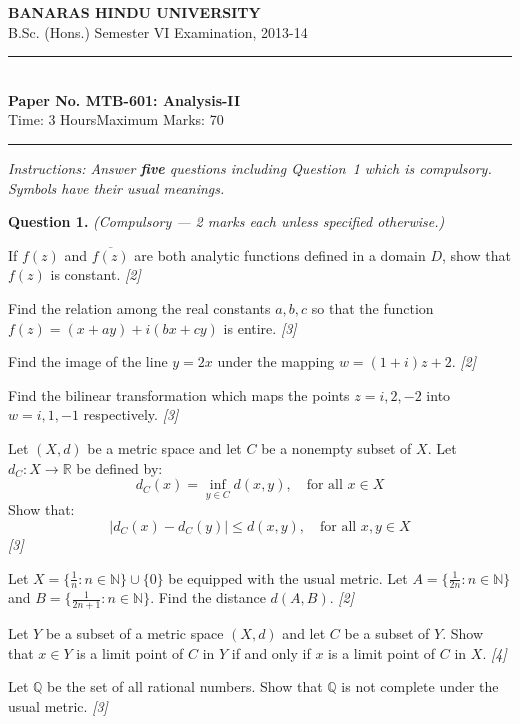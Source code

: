 \documentclass[11pt,a4paper]{article}
\newcommand{\pts}[1]{\hfill   \textit{[#1]}}
\begin{document}
\begin{center}
  {\large\bfseries BANARAS HINDU UNIVERSITY}\\[2pt]
  {\normalsize B.Sc. (Hons.) Semester VI Examination, 2013-14}\\[6pt]
  \rule{0.8\linewidth}{0.5pt}\\[6pt]
  {\large\bfseries Paper No. MTB-601: Analysis-II}\\[4pt]
  {\normalsize Time: 3 Hours\hfill Maximum Marks: 70}
\end{center}

\rule{\linewidth}{0.4pt}

\smallskip



\noindent   \textit{Instructions: Answer   \textbf{five} questions including Question~1 which is compulsory. Symbols have their usual meanings.}

\bigskip




\noindent   \textbf{Question 1.}   \textit{(Compulsory --- 2 marks each unless specified otherwise.)}

\begin{parts}
  \item If $f(z)$ and $\overline{f(z)}$ are both analytic functions defined in a domain $D$, show that $f(z)$ is constant. \pts{2}
  \item Find the relation among the real constants $a, b, c$ so that the function $f(z) = (x + ay) + i(bx + cy)$ is entire. \pts{3}
  \item Find the image of the line $y = 2x$ under the mapping $w = (1+i)z + 2$. \pts{2}
  \item Find the bilinear transformation which maps the points $z = i, 2, -2$ into $w = i, 1, -1$ respectively. \pts{3}
  \item Let $(X,d)$ be a metric space and let $C$ be a nonempty subset of $X$. Let $d_C : X \rightarrow \mathbb{R}$ be defined by:
  \[ d_C(x) = \inf_{y \in C} d(x, y), \quad  \text{for all } x \in X \]
  Show that:
  \[ |d_C(x) - d_C(y)| \le d(x, y), \quad  \text{for all } x, y \in X \] \pts{3}
  \item Let $X = \{ \frac{1}{n} : n \in \mathbb{N} \} \cup \{0\}$ be equipped with the usual metric. Let $A = \{ \frac{1}{2n} : n \in \mathbb{N} \}$ and $B = \{ \frac{1}{2n+1} : n \in \mathbb{N} \}$. Find the distance $d(A, B)$. \pts{2}
  \item Let $Y$ be a subset of a metric space $(X,d)$ and let $C$ be a subset of $Y$. Show that $x \in Y$ is a limit point of $C$ in $Y$ if and only if $x$ is a limit point of $C$ in $X$. \pts{4}
  \item Let $\mathbb{Q}$ be the set of all rational numbers. Show that $\mathbb{Q}$ is not complete under the usual metric. \pts{3}
\end{parts}
\end{document}
